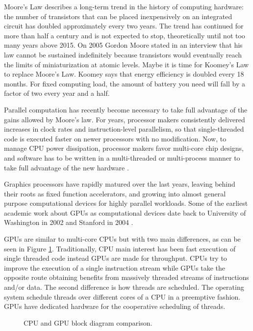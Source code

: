 \documentclass[review]{elsarticle}
\begin{document}
Moore's Law describes a long-term trend in the history of computing
hardware: the number of transistors that can be placed inexpensively
on an integrated circuit has doubled approximately every two
years. The trend has continued for more than half a century and is not
expected to stop, theoretically until not too many years above
2015. On 2005 Gordon Moore stated in an interview that his law cannot
be sustained indefinitely because transistors would eventually reach
the limits of miniaturization at atomic levels. Maybe it is time for
Koomey's Law \cite{10.1109/MAHC.2010.28} to replace Moore's
Law. Koomey says that energy efficiency is doubled every 18
months. For fixed computing load, the amount of battery you need will
fall by a factor of two every year and a half.

Parallel computation has recently become necessary to take full
advantage of the gains allowed by Moore's law. For years, processor
makers consistently delivered increases in clock rates and
instruction-level parallelism, so that single-threaded code is
executed faster on newer processors with no modification. Now, to
manage CPU power dissipation, processor makers favor multi-core chip
designs, and software has to be written in a multi-threaded or
multi-process manner to take full advantage of the new hardware \cite{6307773}.

Graphics processors have rapidly matured over the last years, leaving
behind their roots as fixed function accelerators, and growing into
almost general purpose computational devices for highly parallel
workloads. Some of the earliest academic work about GPUs as
computational devices date back to University of Washington in 2002
\cite{Thompson:2002:UMG:774861.774894} and Stanford in 2004
\cite{Buck:2004:BGS:1015706.1015800}.  %

GPUs are similar to multi-core CPUs but with two main differences,
as can be seen in Figure \ref{fig:cpu-gpu}. Traditionally, CPU
main interest has been fast execution of single threaded code instead
GPUs are made for throughput. CPUs try to improve the execution of a
single instruction stream while GPUs take the opposite route obtaining
benefits from massively threaded streams of instructions and/or
data. The second difference is how threads are scheduled. The
operating system schedule threads over different cores of a CPU in a
preemptive fashion. GPUs have dedicated hardware for the cooperative
scheduling of threads.

\begin{figure}[!h]
\centering
{}
\caption{CPU and GPU block diagram comparison.}
\label{fig:cpu-gpu}
\end{figure}
\end{document}
